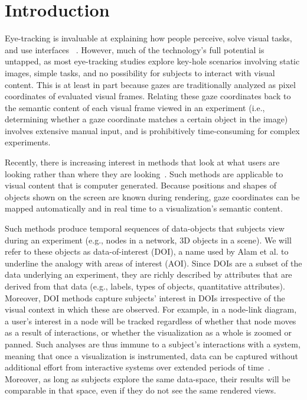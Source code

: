 \section{Introduction}
Eye-tracking is invaluable at explaining how people perceive, solve visual tasks, and use interfaces ~\cite{duchowski2002breadth}. However, much of the technology's full potential is untapped, as most eye-tracking studies explore key-hole scenarios involving static images, simple tasks, and no possibility for subjects to interact with visual content. This is at least in part because gazes are traditionally analyzed as pixel coordinates of evaluated visual frames. Relating these gaze coordinates back to the semantic content of each visual frame viewed in an experiment (i.e., determining whether a gaze coordinate matches a certain object in the image) involves extensive manual input, and is prohibitively time-consuming for complex experiments.
 
Recently, there is increasing interest in methods that look at what users are looking rather than where they are looking~\cite{alamdata, sundstedt2013visual, bernhard2014gaze}. Such methods are applicable to visual content that is computer generated. Because positions and shapes of objects shown on the screen are known during rendering, gaze coordinates can be mapped automatically and in real time to a visualization's semantic content.  

Such methods produce temporal sequences of data-objects that subjects view during an experiment (e.g., nodes in a network, 3D objects in a scene). We will refer to these objects as data-of-interest (DOI), a name used by Alam et al. to underline the analogy with areas of interest (AOI). Since DOIs are a subset of the data underlying an experiment, they are richly described by attributes that are derived from that data (e.g., labels, types of objects, quantitative attributes). Moreover, DOI methods capture subjects' interest in DOIs irrespective of the visual context in which these are observed. For example, in a node-link diagram, a user's interest in a node will be tracked regardless of whether that node moves as a result of interactions, or whether the visualization as a whole is zoomed or panned. Such analyses are thus immune to a subject's interactions with a system, meaning that once a visualization is instrumented, data can be captured without additional effort from interactive systems over extended periods of time~\cite{alamdata}. Moreover, as long as subjects explore the same data-space, their results will be comparable in that space, even if they do not see the same rendered views. 

